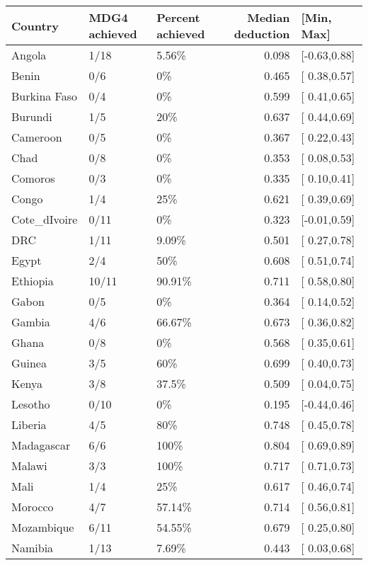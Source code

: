 \begin{table}[ht]
\centering
\begin{tabular}{lllrl}
  \hline
Country & MDG4 achieved & Percent achieved & Median deduction & [Min, Max] \\ 
  \hline
Angola & 1/18 & 5.56\% & 0.098 & [-0.63,0.88] \\ 
  Benin & 0/6 & 0\% & 0.465 & [ 0.38,0.57] \\ 
  Burkina Faso & 0/4 & 0\% & 0.599 & [ 0.41,0.65] \\ 
  Burundi & 1/5 & 20\% & 0.637 & [ 0.44,0.69] \\ 
  Cameroon & 0/5 & 0\% & 0.367 & [ 0.22,0.43] \\ 
  Chad & 0/8 & 0\% & 0.353 & [ 0.08,0.53] \\ 
  Comoros & 0/3 & 0\% & 0.335 & [ 0.10,0.41] \\ 
  Congo & 1/4 & 25\% & 0.621 & [ 0.39,0.69] \\ 
  Cote\_dIvoire & 0/11 & 0\% & 0.323 & [-0.01,0.59] \\ 
  DRC & 1/11 & 9.09\% & 0.501 & [ 0.27,0.78] \\ 
  Egypt & 2/4 & 50\% & 0.608 & [ 0.51,0.74] \\ 
  Ethiopia & 10/11 & 90.91\% & 0.711 & [ 0.58,0.80] \\ 
  Gabon & 0/5 & 0\% & 0.364 & [ 0.14,0.52] \\ 
  Gambia & 4/6 & 66.67\% & 0.673 & [ 0.36,0.82] \\ 
  Ghana & 0/8 & 0\% & 0.568 & [ 0.35,0.61] \\ 
  Guinea & 3/5 & 60\% & 0.699 & [ 0.40,0.73] \\ 
  Kenya & 3/8 & 37.5\% & 0.509 & [ 0.04,0.75] \\ 
  Lesotho & 0/10 & 0\% & 0.195 & [-0.44,0.46] \\ 
  Liberia & 4/5 & 80\% & 0.748 & [ 0.45,0.78] \\ 
  Madagascar & 6/6 & 100\% & 0.804 & [ 0.69,0.89] \\ 
  Malawi & 3/3 & 100\% & 0.717 & [ 0.71,0.73] \\ 
  Mali & 1/4 & 25\% & 0.617 & [ 0.46,0.74] \\ 
  Morocco & 4/7 & 57.14\% & 0.714 & [ 0.56,0.81] \\ 
  Mozambique & 6/11 & 54.55\% & 0.679 & [ 0.25,0.80] \\ 
  Namibia & 1/13 & 7.69\% & 0.443 & [ 0.03,0.68] \\ 

\end{tabular}
\end{table}
